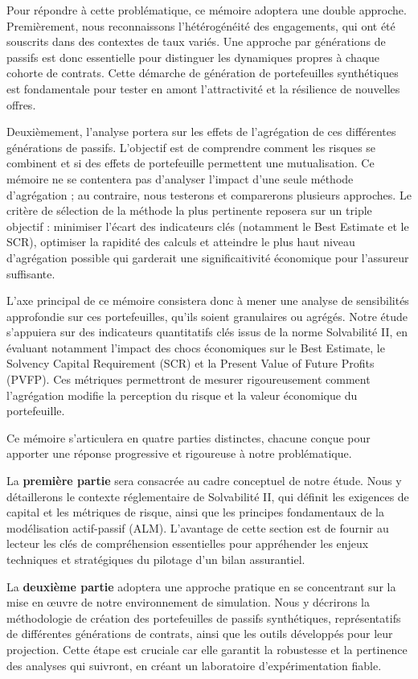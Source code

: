 Pour répondre à cette problématique, ce mémoire adoptera une double approche. Premièrement, nous reconnaissons l'hétérogénéité des engagements, qui ont été souscrits dans des contextes de taux variés. Une approche par générations de passifs est donc essentielle pour distinguer les dynamiques propres à chaque cohorte de contrats. Cette démarche de génération de portefeuilles synthétiques est fondamentale pour tester en amont l'attractivité et la résilience de nouvelles offres.

Deuxièmement, l'analyse portera sur les effets de l'agrégation de ces différentes générations de passifs. L'objectif est de comprendre comment les risques se combinent et si des effets de portefeuille permettent une mutualisation. Ce mémoire ne se contentera pas d'analyser l'impact d'une seule méthode d'agrégation ; au contraire, nous testerons et comparerons plusieurs approches. Le critère de sélection de la méthode la plus pertinente reposera sur un triple objectif : minimiser l'écart des indicateurs clés (notamment le Best Estimate et le SCR), optimiser la rapidité des calculs et atteindre le plus haut niveau d'agrégation possible qui garderait une significaitivité économique pour l'assureur suffisante.

L'axe principal de ce mémoire consistera donc à mener une analyse de sensibilités approfondie sur ces portefeuilles, qu'ils soient granulaires ou agrégés. Notre étude s'appuiera sur des indicateurs quantitatifs clés issus de la norme Solvabilité II, en évaluant notamment l'impact des chocs économiques sur le Best Estimate, le Solvency Capital Requirement (SCR) et la Present Value of Future Profits (PVFP). Ces métriques permettront de mesurer rigoureusement comment l'agrégation modifie la perception du risque et la valeur économique du portefeuille.

Ce mémoire s'articulera en quatre parties distinctes, chacune conçue pour apporter une réponse progressive et rigoureuse à notre problématique.


La \textbf{première partie} sera consacrée au cadre conceptuel de notre étude. Nous y détaillerons le contexte réglementaire de Solvabilité II, qui définit les exigences de capital et les métriques de risque, ainsi que les principes fondamentaux de la modélisation actif-passif (ALM). L'avantage de cette section est de fournir au lecteur les clés de compréhension essentielles pour appréhender les enjeux techniques et stratégiques du pilotage d'un bilan assurantiel.


La \textbf{deuxième partie} adoptera une approche pratique en se concentrant sur la mise en œuvre de notre environnement de simulation. Nous y décrirons la méthodologie de création des portefeuilles de passifs synthétiques, représentatifs de différentes générations de contrats, ainsi que les outils développés pour leur projection. Cette étape est cruciale car elle garantit la robustesse et la pertinence des analyses qui suivront, en créant un laboratoire d'expérimentation fiable.



